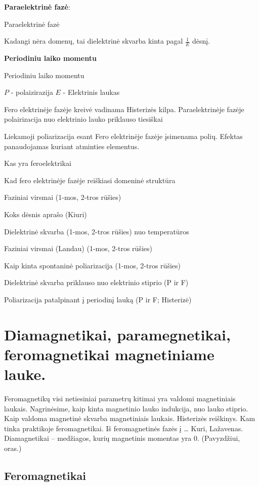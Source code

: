 \textbf{Paraelektrinė fazė}:

{Paraelektrinė fazė}

Kadangi nėra domenų, tai dielektrinė skvarba kinta pagal $\frac{1}{E}$
dėsnį.

\textbf{Periodiniu laiko momentu}

{Periodiniu laiko momentu}

$P$ - polaizirazija
$E$ - Elektrinis laukas

Fero elektrinėje fazėje kreivė vadinama Histerizės kilpa.
Paraelektrinėje fazėje polairizacija nuo elektrinio lauko priklauso tiesiškai

Liekamoji poliarizacija esant Fero elektrinėje fazėje įsimenama polių.
Efektas panaudojamas kuriant atminties elementus.

\begin{remember}
	\item Kas yra feroelektrikai
	\item Kad fero elektrinėje fazėje reiškiasi domeninė struktūra
	\item Faziniai virsmai (1-mos, 2-tros rūšies)
	\item Koks dėsnis aprašo (Kiuri)
	\item Dielektrinė skvarba (1-mos, 2-tros rūšies) nuo temperatūros
	\item Faziniai virsmai (Landau) (1-mos, 2-tros rūšies)
	\item Kaip kinta spontaninė poliarizacija (1-mos, 2-tros rūšies)
	\item Dielektrinė skvarba priklauso nuo elektrinio stiprio (P ir F)
	\item Poliarizacija patalpinant į periodinį lauką (P ir F; Histerizė)
\end{remember}

\section{Diamagnetikai, paramegnetikai, feromagnetikai magnetiniame lauke.}
Feromagnetikų visi netiesiniai parametrų kitimai yra valdomi magnetiniais
laukais. Nagrinėsime, kaip kinta magnetinio lauko indukcija, nuo
lauko stiprio. Kaip valdoma magnetinė skvarba magnetiniais laukais.
Histerizės reiškinys. Kam tinka praktikoje feromagnetikai. Iš
feromagnetinės fazės į … Kuri, Lažavenas. Diamagnetikai – medžiagos, kurių
magnetinis momentas yra 0. (Pavyzdžiui, oras.)


\subsection{Feromagnetikai}

